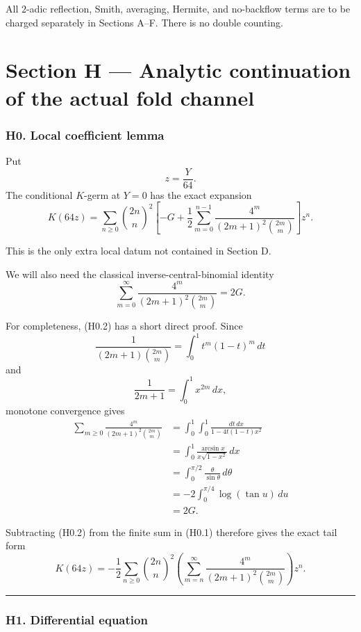 \documentclass[
  10pt,
  letterpaper,
]{article}
\theoremstyle{definition}
\theoremstyle{remark}
\begin{document}
All \(2\)-adic reflection, Smith, averaging, Hermite, and no-backflow
terms are to be charged separately in Sections A--F. There is no double
counting.

\section{Section H --- Analytic continuation of the actual fold
channel}\label{section-h-analytic-continuation-of-the-actual-fold-channel}

\subsubsection{H0. Local coefficient
lemma}\label{h0.-local-coefficient-lemma}

Put \[
z=\frac{Y}{64}.
\] The conditional \(K\)-germ at \(Y=0\) has the exact expansion \[
\boxed{
K(64z)
=
\sum_{n\ge0}\binom{2n}{n}^2
\left[
-G+
\frac12\sum_{m=0}^{n-1}
\frac{4^m}{(2m+1)^2\binom{2m}{m}}
\right]z^n .
}
\tag{H0.1}
\]

This is the only extra local datum not contained in Section D.

We will also need the classical inverse-central-binomial identity \[
\boxed{
\sum_{m=0}^{\infty}
\frac{4^m}{(2m+1)^2\binom{2m}{m}}
=2G.
}
\tag{H0.2}
\]

For completeness, (H0.2) has a short direct proof. Since \[
\frac{1}{(2m+1)\binom{2m}{m}}
=
\int_0^1 t^m(1-t)^m\,dt
\] and \[
\frac1{2m+1}=\int_0^1x^{2m}\,dx,
\] monotone convergence gives \[
\begin{aligned}
\sum_{m\ge0}
\frac{4^m}{(2m+1)^2\binom{2m}{m}}
&=
\int_0^1\!\!\int_0^1
\frac{dt\,dx}{1-4t(1-t)x^2}\\
&=
\int_0^1
\frac{\arcsin x}{x\sqrt{1-x^2}}\,dx\\
&=
\int_0^{\pi/2}\frac{\theta}{\sin\theta}\,d\theta\\
&=
-2\int_0^{\pi/4}\log(\tan u)\,du\\
&=2G.
\end{aligned}
\]

Subtracting (H0.2) from the finite sum in (H0.1) therefore gives the
exact tail form \[
\boxed{
K(64z)
=
-\frac12\sum_{n\ge0}
\binom{2n}{n}^2
\left(
\sum_{m=n}^{\infty}
\frac{4^m}{(2m+1)^2\binom{2m}{m}}
\right)z^n .
}
\tag{H0.3}
\]

\begin{center}\rule{0.5\linewidth}{0.5pt}\end{center}

\subsubsection{H1. Differential
equation}\label{h1.-differential-equation}
\end{document}
